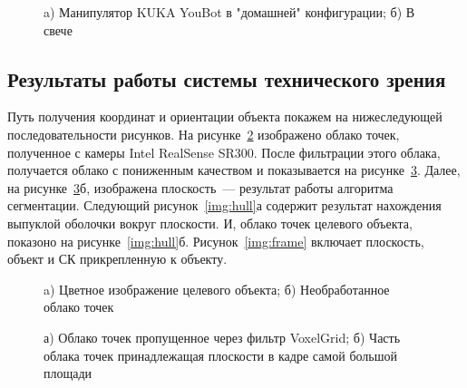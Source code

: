 \begin{figure}[h!]
	\begin{minipage}[h]{0.5\linewidth}
	\end{minipage}
	\hfill
	\begin{minipage}[h]{0.5\linewidth}
	\end{minipage}
	\caption{a) Манипулятор KUKA YouBot в "домашней" конфигурации; б) В свече}
	\label{img:model}
\end{figure}

\subsection{Результаты работы системы технического зрения}

Путь получения координат и ориентации объекта покажем на нижеследующей последовательности рисунков. На рисунке~\ref{img:raw_cloud} изображено облако точек, полученное с камеры Intel RealSense SR300. После фильтрации этого облака, получается облако с пониженным качеством и показывается на рисунке~\ref{img:downsampled_cloud}. Далее, на рисунке~\ref{img:downsampled_cloud}б, изображена плоскость~--- результат работы алгоритма сегментации. Следующий рисунок~\ref{img:hull}а содержит результат нахождения выпуклой оболочки вокруг плоскости. И, облако точек целевого объекта, показоно на рисунке~\ref{img:hull}б. Рисунок~\ref{img:frame} включает плоскость, объект и СК прикрепленную к объекту.

\begin{figure}[h!]
	\begin{minipage}[h]{0.5\linewidth}
	\end{minipage}
	\hfill
	\begin{minipage}[h]{0.5\linewidth}
	\end{minipage}
	\caption{a) Цветное изображение целевого объекта; б) Необработанное облако точек}
	\label{img:raw_cloud}
\end{figure}

\begin{figure}[h!]
	\begin{minipage}[h]{0.5\linewidth}
	\end{minipage}
	\hfill
	\begin{minipage}[h]{0.5\linewidth}
	\end{minipage}
	\caption{а) Облако точек пропущенное через фильтр VoxelGrid; б) Часть облака точек принадлежащая плоскости в кадре самой большой площади}
	\label{img:downsampled_cloud}
\end{figure}


